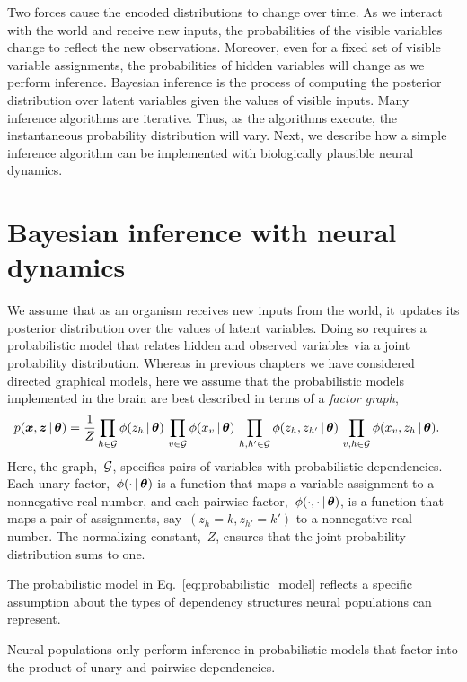 Two forces cause the encoded distributions to change over time. As
we interact with the world and receive new inputs, the probabilities
of the visible variables change to reflect the new
observations. Moreover, even for a fixed set of visible variable
assignments, the probabilities of hidden variables will change as we
perform inference. Bayesian inference is the process of computing the
posterior distribution over latent variables given the values of visible
inputs. Many inference algorithms are iterative. Thus, as the
algorithms execute, the instantaneous probability distribution will
vary. Next, we describe how a simple inference algorithm can be
implemented with biologically plausible neural dynamics.

\section{Bayesian inference with neural dynamics}
We assume that as an organism receives new inputs from the world, it
updates its posterior distribution over the values of latent
variables. Doing so requires a probabilistic model that relates hidden
and observed variables via a joint probability distribution.  Whereas
in previous chapters we have considered directed graphical models,
here we assume that the probabilistic models implemented in the brain
are best described in terms of a \emph{factor graph},
\begin{align}
  \label{eq:probabilistic_model}
  p(\boldsymbol{x}, \boldsymbol{z} \,|\, \boldsymbol{\theta}) &=
  \frac{1}{Z}
  \prod_{h \in \mathcal{G}} \phi(z_h \,|\, \boldsymbol{\theta}) \,
  \prod_{v \in \mathcal{G}} \phi(x_v \,|\, \boldsymbol{\theta}) \,
  \prod_{h,h' \in \mathcal{G}} \phi(z_h, z_{h'} \,|\, \boldsymbol{\theta}) \,
  \prod_{v,h \in \mathcal{G}} \phi(x_v, z_{h} \,|\, \boldsymbol{\theta}).
\end{align}
Here, the graph,~$\mathcal{G}$, specifies pairs of variables with
probabilistic dependencies.  Each unary factor,~$\phi(\cdot \,|\,
\boldsymbol{\theta})$ is a function that maps a variable assignment to a
nonnegative real number, and each pairwise factor,~$\phi(\cdot, \cdot
\,|\, \boldsymbol{\theta})$, is a function that maps a pair of assignments,
say~${(z_h=k, z_{h'}=k')}$ to a nonnegative real number. The
normalizing constant,~$Z$, ensures that the joint probability
distribution sums to one.

The probabilistic model in Eq.~\ref{eq:probabilistic_model} reflects
a specific assumption about the types of dependency structures
neural populations can represent.

\begin{assumption}
  Neural populations only perform inference in probabilistic models
  that factor into the product of unary and pairwise dependencies. 
\end{assumption}

